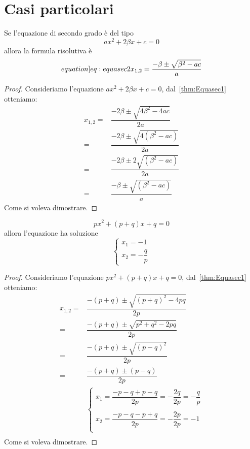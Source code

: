 \section{Casi particolari}
\begin{thm}\label{thm:Equasec2}
	Se l'equazione di secondo grado è del tipo\[ax^2+2\beta x+c=0 \] allora la formula risolutiva è \begin{equation*}\label[equation]{eq:equasec2}
	x_{1,2}=\dfrac{-\beta\pm\sqrt{\beta^2- ac}}{a}
	\end{equation*}
\end{thm}
\begin{proof}
Consideriamo l'equazione $ax^2+2\beta x+c=0$, dal~\cref{thm:Equasec1} otteniamo:
\begin{align*}
x_{1,2}=&\dfrac{-2\beta\pm\sqrt{4\beta^2-4ac}}{2a}\\
=&\dfrac{-2\beta\pm\sqrt{4(\beta^2-ac)}}{2a}\\
=&\dfrac{-2\beta\pm 2\sqrt{(\beta^2-ac)}}{2a}\\
=&\dfrac{-\beta\pm \sqrt{(\beta^2-ac)}}{a}
\end{align*}
Come si voleva dimostrare.
\end{proof}
\begin{thm}\label{thm:Equasec3}
	\[px^2+(p+q)x+q=0 \] allora l'equazione ha soluzione \[\begin{cases}
	x_1=-1\\ x_2=-\dfrac{q}{p}
	\end{cases}\]
\end{thm}
\begin{proof}
	Consideriamo l'equazione $px^2+(p+q) x+q=0$, dal~\cref{thm:Equasec1} otteniamo:
	\begin{align*}
	x_{1,2}=&\dfrac{-(p+q)\pm\sqrt{(p+q)^2-4pq}}{2p}\\
	=&\dfrac{-(p+q)\pm\sqrt{p^2+q^2-2pq}}{2p}\\
	=&\dfrac{-(p+q)\pm\sqrt{(p-q)^2}}{2p}\\
	=&\dfrac{-(p+q)\pm(p-q)}{2p}\\
	&\begin{cases}
	x_1=\dfrac{-p-q+p-q}{2p}=-\dfrac{2q}{2p}=-\dfrac{q}{p}\\ \\
	x_2=\dfrac{-p-q-p+q}{2p}=-\dfrac{2p}{2p}=-1\\
	\end{cases}\\
	\end{align*}
	Come si voleva dimostrare.
\end{proof}